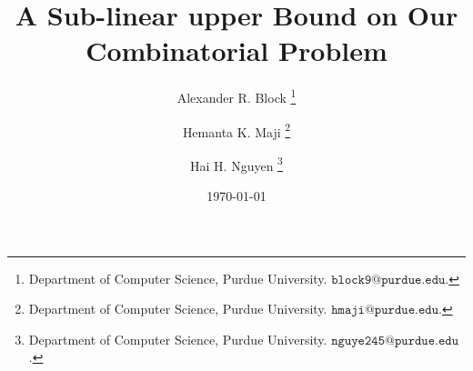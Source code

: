 \documentclass[11pt]{article}
\begin{document}
\def\majiemail{hmaji@purdue.edu}
\def\haiemail{nguye245@purdue.edu}
\def\alexemail{block9@purdue.edu}
\author{
  Alexander R. Block%
  \thanks{
	  Department of Computer Science,
	  Purdue University.
	  \href{mailto:\alexemail}{$\mathtt{\alexemail}$}.
  }\and 
  Hemanta K. Maji%
  \thanks{
    Department of Computer Science,
    Purdue University.
    \href{mailto:\majiemail}{$\mathtt{\majiemail}$}.
  }\and
  Hai H. Nguyen%
  \thanks{
	  Department of Computer Science,
	  Purdue University.
	  \href{mailto:\haiemail}{$\mathtt{\haiemail}$}.
  } 
}


\title{A Sub-linear upper Bound on Our Combinatorial Problem}

\date{\today}

\maketitle

\pagestyle{empty}
\thispagestyle{empty}

%

\newpage
\newlength{\temp}
\setlength{\temp}{\parskip}
\setlength{\parskip}{.4\parskip}
\tableofcontents
\setlength{\parskip}{\temp}

\newpage
\setcounter{page}{1}
\pagestyle{plain}

\newpage







\newpage



\newpage
\appendix
\end{document}
